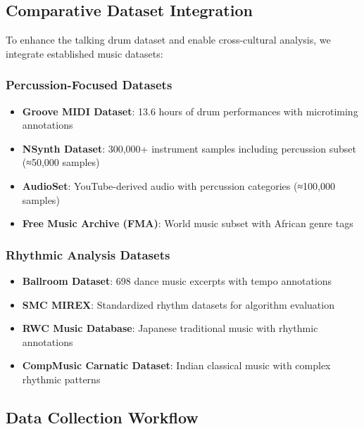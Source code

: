\documentclass[12pt]{article}
\begin{document}
\subsection{Comparative Dataset Integration}

To enhance the talking drum dataset and enable cross-cultural analysis, we integrate established music datasets:

\subsubsection{Percussion-Focused Datasets}
\begin{itemize}
    \item \textbf{Groove MIDI Dataset}: 13.6 hours of drum performances with microtiming annotations
    \item \textbf{NSynth Dataset}: 300,000+ instrument samples including percussion subset (≈50,000 samples)
    \item \textbf{AudioSet}: YouTube-derived audio with percussion categories (≈100,000 samples)
    \item \textbf{Free Music Archive (FMA)}: World music subset with African genre tags
\end{itemize}

\subsubsection{Rhythmic Analysis Datasets}
\begin{itemize}
    \item \textbf{Ballroom Dataset}: 698 dance music excerpts with tempo annotations
    \item \textbf{SMC MIREX}: Standardized rhythm datasets for algorithm evaluation
    \item \textbf{RWC Music Database}: Japanese traditional music with rhythmic annotations
    \item \textbf{CompMusic Carnatic Dataset}: Indian classical music with complex rhythmic patterns
\end{itemize}

\subsection{Data Collection Workflow}
\end{document}
